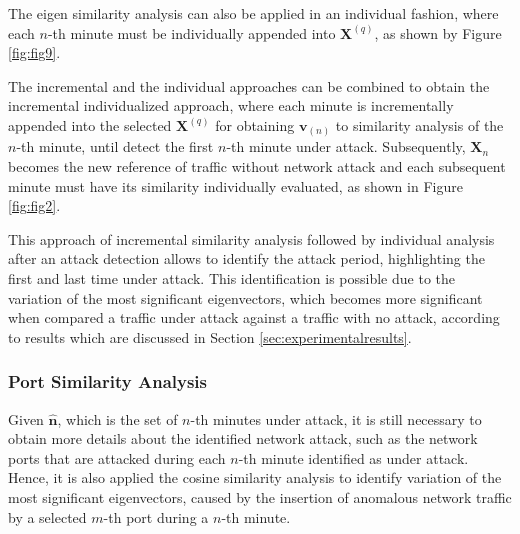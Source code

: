 \documentclass{bmcart}
\begin{document}
The eigen similarity analysis can also be applied in an individual fashion, where each $n$-th minute must be individually appended into $\boldsymbol{X}^{(q)}$, as shown by Figure \ref{fig:fig9}.


The incremental and the individual approaches can be combined to obtain the incremental individualized approach, where each minute is incrementally appended into the selected $\boldsymbol{X}^{(q)}$ for obtaining $\boldsymbol{v}_{(n)}$ to similarity analysis of the $n$-th minute, until detect the first $n$-th minute under attack. Subsequently, $\boldsymbol{X}_n$ becomes the new reference of traffic without network attack and each subsequent minute must have its similarity individually evaluated, as shown in Figure \ref{fig:fig2}.


This approach of incremental similarity analysis followed by individual analysis after an attack detection allows to identify the attack period, highlighting the first and last time under attack. This identification is possible due to the variation of the most significant eigenvectors, which becomes more significant when compared a traffic under attack against a traffic with no attack, according to results which are discussed in Section \ref{sec:experimentalresults}.

\subsubsection{Port Similarity Analysis}
\label{sec:prop_PortSimilarityAnalysis}

Given $\boldsymbol{\hat{n}}$, which is the set of $n$-th minutes under attack, it is still necessary to obtain more details about the identified network attack, such as the network ports that are attacked during each $n$-th minute identified as under attack. Hence, it is also applied the cosine similarity analysis to identify variation of the most significant eigenvectors, caused by the insertion of anomalous network traffic by a selected $m$-th port during a $n$-th minute. 
\end{document}
